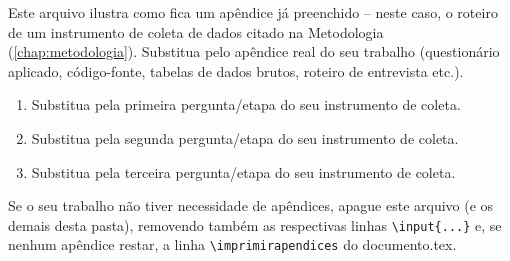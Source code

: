 \label{ap:roteiro-de-entrevista-exemplo}

Este arquivo ilustra como fica um apêndice já preenchido -- neste caso, o roteiro de um instrumento de coleta de dados citado na Metodologia (\autoref{chap:metodologia}). Substitua pelo apêndice real do seu trabalho (questionário aplicado, código-fonte, tabelas de dados brutos, roteiro de entrevista etc.).

\begin{enumerate}
	\item Substitua pela primeira pergunta/etapa do seu instrumento de coleta.
	\item Substitua pela segunda pergunta/etapa do seu instrumento de coleta.
	\item Substitua pela terceira pergunta/etapa do seu instrumento de coleta.
\end{enumerate}

Se o seu trabalho não tiver necessidade de apêndices, apague este arquivo (e os demais desta pasta), removendo também as respectivas linhas \texttt{\textbackslash input\{...\}} e, se nenhum apêndice restar, a linha \texttt{\textbackslash imprimirapendices} do documento.tex.
